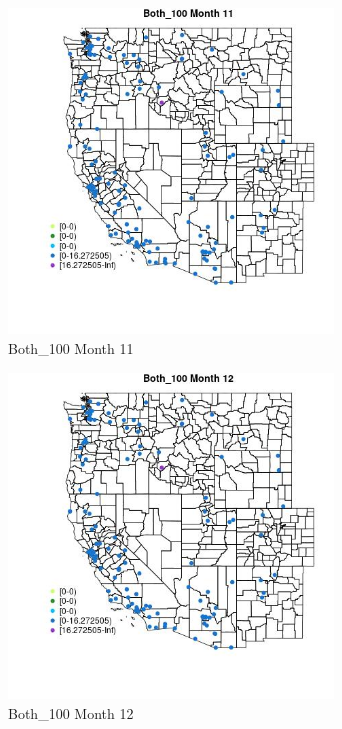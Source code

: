\begin{figure} 
\centering  
\includegraphics[width=0.77\textwidth]{Code_Outputs/Report_ML_input_PM25_Step4_part_e_de_duplicated_aves_MapObsMo11Both_100.jpg} 
\caption{\label{fig:Report_ML_input_PM25_Step4_part_e_de_duplicated_avesMapObsMo11Both_100}Both_100 Month 11} 
\end{figure} 
 

\begin{figure} 
\centering  
\includegraphics[width=0.77\textwidth]{Code_Outputs/Report_ML_input_PM25_Step4_part_e_de_duplicated_aves_MapObsMo12Both_100.jpg} 
\caption{\label{fig:Report_ML_input_PM25_Step4_part_e_de_duplicated_avesMapObsMo12Both_100}Both_100 Month 12} 
\end{figure} 
 

